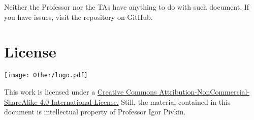 Neither the Professor nor the TAs have anything to do with such document. If you have issues, visit the repository on GitHub.




\section*{License}
\begin{center}
\texttt{[image: Other/logo.pdf]}
\end{center}
This work is licensed under a \href{http://creativecommons.org/licenses/by-nc-sa/4.0/}{Creative Commons Attribution-NonCommercial-ShareAlike 4.0 International License.} Still, the material contained in this document is intellectual property of Professor Igor Pivkin.

